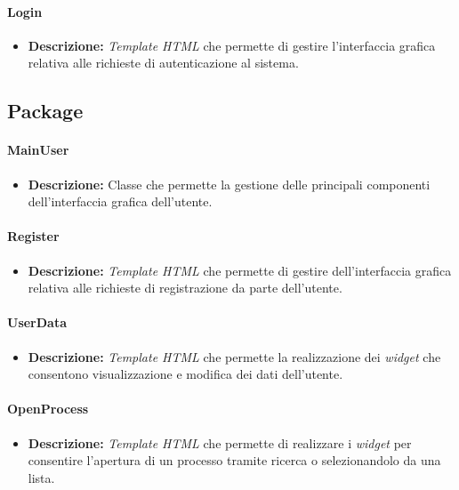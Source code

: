 \paragraph{Login}
\label{loginTemplate}
\begin{itemize}
\item \textbf{Descrizione:} \textit{Template HTML} che permette di gestire l'interfaccia grafica relativa alle richieste di autenticazione al sistema.
\end{itemize}

\subsection{Package \viewUser{}}

\paragraph{MainUser}
\label{mainUserTemplate}
\begin{itemize}
\item \textbf{Descrizione:} Classe che permette la gestione delle principali componenti dell'interfaccia grafica dell'utente.
\end{itemize}

\paragraph{Register}
\label{registerTemplate}
\begin{itemize}
\item \textbf{Descrizione:} \textit{Template HTML} che permette di gestire dell'interfaccia grafica relativa alle richieste di registrazione da parte dell'utente.
\end{itemize}

\paragraph{UserData}
\label{userDataTemplate}
\begin{itemize}
\item \textbf{Descrizione:} \textit{Template HTML} che permette la realizzazione dei \textit{widget} che consentono visualizzazione e modifica dei dati dell'utente.
\end{itemize}

\paragraph{OpenProcess}
\label{openProcessTemplate}
\begin{itemize}
\item \textbf{Descrizione:} \textit{Template HTML} che permette di realizzare i \textit{widget} per consentire l'apertura di un processo tramite ricerca o selezionandolo da una lista.
\end{itemize}


